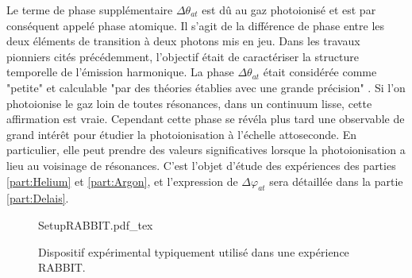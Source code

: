 Le terme de phase supplémentaire $\Delta \theta_{at}$ est dû au gaz photoionisé et est par conséquent appelé phase atomique. Il s'agit de la différence de phase entre les deux éléments de transition à deux photons mis en jeu. Dans les travaux pionniers cités précédemment, l'objectif était de caractériser la structure temporelle de l'émission harmonique. La phase $\Delta \theta_{at}$ était considérée comme "petite" et calculable "par des théories établies avec une grande précision" . Si l'on photoionise le gaz loin de toutes résonances, dans un continuum lisse, cette affirmation est vraie. Cependant cette phase se révéla plus tard une observable de grand intérêt pour étudier la photoionisation à l'échelle attoseconde. En particulier, elle peut prendre des valeurs significatives lorsque la photoionisation a lieu au voisinage de résonances. C'est l'objet d'étude des expériences des parties \ref{part:Helium} et \ref{part:Argon}, et l'expression de $\Delta \varphi_{at}$ sera détaillée dans la partie \ref{part:Delais}.

\begin{figure}[ht]
\centering
\def\svgwidth{\columnwidth}
{SetupRABBIT.pdf_tex}
\caption{Dispositif expérimental typiquement utilisé dans une expérience RABBIT.}
\label{fig:SetupRabbit}
\end{figure}

